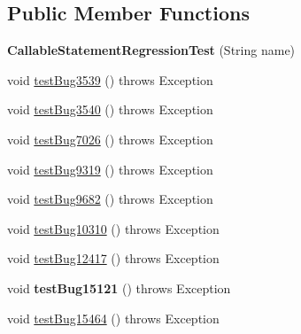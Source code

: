 \subsection*{Public Member Functions}
\begin{DoxyCompactItemize}
\item 
\mbox{\label{classtestsuite_1_1regression_1_1_callable_statement_regression_test_af9ef106e44b57c0840c422e64fb25fe7}} 
{\bfseries Callable\+Statement\+Regression\+Test} (String name)
\item 
void \mbox{\hyperlink{classtestsuite_1_1regression_1_1_callable_statement_regression_test_a6c39c2788d35a24b2933541c30b8738d}{test\+Bug3539}} ()  throws Exception 
\item 
void \mbox{\hyperlink{classtestsuite_1_1regression_1_1_callable_statement_regression_test_a060bce79977b8f767964814bd7f23f80}{test\+Bug3540}} ()  throws Exception 
\item 
void \mbox{\hyperlink{classtestsuite_1_1regression_1_1_callable_statement_regression_test_a7bf5345327e03c1c948299a62ca552c7}{test\+Bug7026}} ()  throws Exception 
\item 
void \mbox{\hyperlink{classtestsuite_1_1regression_1_1_callable_statement_regression_test_aeeca9a21c07d1325e181cbd40bef0199}{test\+Bug9319}} ()  throws Exception 
\item 
void \mbox{\hyperlink{classtestsuite_1_1regression_1_1_callable_statement_regression_test_aa84b6f7f456f3d576c6d8c22213a24b2}{test\+Bug9682}} ()  throws Exception 
\item 
void \mbox{\hyperlink{classtestsuite_1_1regression_1_1_callable_statement_regression_test_a8cd92a05056f0d180cf2d2f9f68bea36}{test\+Bug10310}} ()  throws Exception 
\item 
void \mbox{\hyperlink{classtestsuite_1_1regression_1_1_callable_statement_regression_test_a94871dee0acb2b3df8de40559b08d32d}{test\+Bug12417}} ()  throws Exception 
\item 
\mbox{\label{classtestsuite_1_1regression_1_1_callable_statement_regression_test_a8378792de361d7a282b26a61c3b2f8a9}} 
void {\bfseries test\+Bug15121} ()  throws Exception 
\item 
void \mbox{\hyperlink{classtestsuite_1_1regression_1_1_callable_statement_regression_test_a5448d02b9a24375eb4b2d175d273c20f}{test\+Bug15464}} ()  throws Exception 

\end{DoxyCompactItemize}
